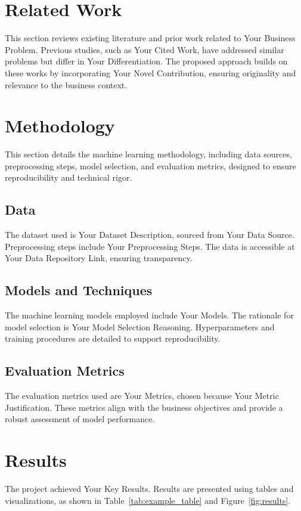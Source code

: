 \documentclass[conference]{IEEEtran}
\begin{document}
\section{Related Work}
\label{sec:related_work}
This section reviews existing literature and prior work related to Your Business Problem. Previous studies, such as Your Cited Work, have addressed similar problems but differ in Your Differentiation. The proposed approach builds on these works by incorporating Your Novel Contribution, ensuring originality and relevance to the business context.

\section{Methodology}
This section details the machine learning methodology, including data sources, preprocessing steps, model selection, and evaluation metrics, designed to ensure reproducibility and technical rigor.

\subsection{Data}
The dataset used is Your Dataset Description, sourced from Your Data Source. Preprocessing steps include Your Preprocessing Steps. The data is accessible at Your Data Repository Link, ensuring transparency.

\subsection{Models and Techniques}
The machine learning models employed include Your Models. The rationale for model selection is Your Model Selection Reasoning. Hyperparameters and training procedures are detailed to support reproducibility.

\subsection{Evaluation Metrics}
The evaluation metrics used are Your Metrics, chosen because Your Metric Justification. These metrics align with the business objectives and provide a robust assessment of model performance.

\section{Results}
The project achieved Your Key Results. Results are presented using tables and visualizations, as shown in Table~\ref{tab:example_table} and Figure~\ref{fig:results}.
\end{document}
